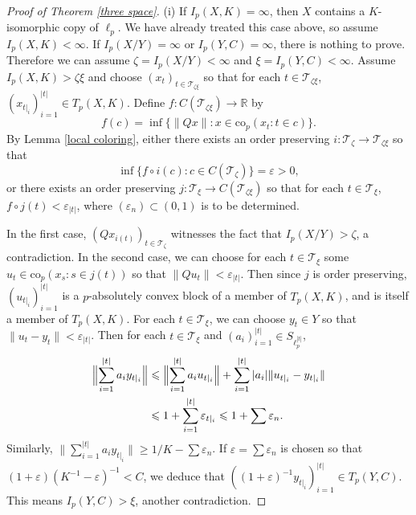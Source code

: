 \documentclass[12pt]{amsart}
\theoremstyle{definition}
\newcommand{\rr}{\mathbb{R}}
\newcommand{\ttt}{\mathcal{T}}
\begin{document}
\begin{proof}[Proof of Theorem \ref{three space}]


(i) If $I_p(X, K)=\infty$, then $X$ contains a $K$-isomorphic copy of $\ell_p$. We have already treated this case above, so assume $I_p(X, K)<\infty$.  If $I_p(X/Y)=\infty$ or $I_p(Y, C)=\infty$, there is nothing to prove.   Therefore we can assume $\zeta= I_p(X/Y)<\infty$ and $\xi= I_p(Y, C)<\infty$.  Assume $I_p(X, K)>\zeta\xi$ and choose $(x_t)_{t\in \ttt_{\zeta\xi}}$ so that for each $t\in \ttt_{\zeta\xi}$, $(x_{t|_i})_{i=1}^{|t|}\in T_p(X, K)$.  Define $f:C(\ttt_{\zeta\xi})\to \rr$ by $$f(c)=\inf \{\|Qx\|: x\in \text{co}_p(x_t: t\in c)\}.$$  By Lemma \ref{local coloring}, either there exists an order preserving $i:\ttt_\zeta\to \ttt_{\zeta\xi}$ so that $$\inf \{f\circ i(c): c\in C(\ttt_\zeta)\}=\varepsilon>0,$$ or there exists an order preserving $j:\ttt_\xi\to C(\ttt_{\zeta\xi})$ so that for each $t\in \ttt_\xi$, $f\circ j(t)<\varepsilon_{|t|}$, where $(\varepsilon_n)\subset (0,1)$ is to be determined.  

In the first case, $(Qx_{i(t)})_{t\in \ttt_\zeta}$ witnesses the fact that $I_p(X/Y)>\zeta$, a contradiction. In the second case, we can choose for each $t\in \ttt_\xi$ some $u_t\in \text{co}_p(x_s: s\in j(t))$ so that $\|Qu_t\|< \varepsilon_{|t|}$. Then since $j$ is order preserving, $(u_{t|_i})_{i=1}^{|t|}$ is a $p$-absolutely convex block of a member of $T_p(X, K)$, and is itself a member of $T_p(X, K)$.  For each $t\in \ttt_\xi$, we can choose $y_t\in Y$ so that $\|u_t-y_t\|<\varepsilon_{|t|}$.  Then for each $t\in \ttt_\xi$ and $(a_i)_{i=1}^{|t|}\in S_{\ell_p^{|t|}}$, \begin{align*} \Bigl\|\sum_{i=1}^{|t|} a_i y_{t|_i}\Bigr\| & \leqslant \Bigl\|\sum_{i=1}^{|t|} a_i u_{t|_i}\Bigr\| + \sum_{i=1}^{|t|}|a_i|\|u_{t|_i}- y_{t|_i}\| \\ & \leqslant 1+ \sum_{i=1}^{|t|} \varepsilon_{t|_i} \leqslant 1+\sum\varepsilon_n.\end{align*}  Similarly, $\|\sum_{i=1}^{|t|} a_i y_{t|_i}\|\geqslant 1/K- \sum \varepsilon_n$.  If $\varepsilon= \sum \varepsilon_n$ is chosen so that $(1+\varepsilon)(K^{-1}-\varepsilon)^{-1}<C$, we deduce that $((1+\varepsilon)^{-1}y_{t|_i})_{i=1}^{|t|}\in T_p(Y, C)$.  This means $I_p(Y,C)>\xi$, another contradiction.  



\end{proof}
\end{document}

